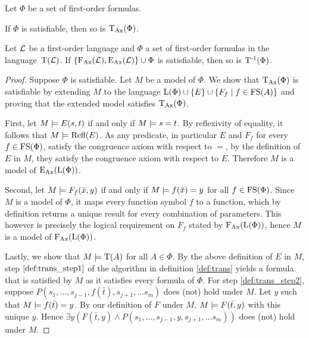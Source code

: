 \begin{prop}
	\label{prop:trans_sat_equiv}
	Let $\Phi$ be a set of first-order formulas.
	\begin{compactenum}
		\item If $\Phi$ is satisfiable, then so is $\operatorname{\operatorname{T}_{Ax}}(\Phi)$.
			\label{prop:trans_sat_equiv1}
		\item Let $\operatorname{\mathcal{L}}$ be a first-order language and $\Phi$ a set of first-order formulas in the language~$\operatorname{T}(\operatorname{\mathcal{L}})$.
			If $\{\operatorname{F_{Ax}}(\operatorname{\mathcal{L}}), \operatorname{E_{Ax}}(\operatorname{\mathcal{L}})\} \cup \Phi $ is satisfiable, then so is $\operatorname{T^{-1}}(\Phi)$.
			\label{prop:trans_sat_equiv2}
	\end{compactenum}
\end{prop}
\begin{proof}
	Suppose $\Phi$ is satisfiable.
	Let $M$ be a model of $\Phi$.
	We show that $\operatorname{\operatorname{T}_{Ax}}(\Phi)$ is satisfiable by extending $M$ to the language $\operatorname{L}(\Phi)\cup\{E\}\cup\{F_f\mid f \in \operatorname{FS}(A)\}$ and proving that the extended model satisfies $\operatorname{\operatorname{T}_{Ax}}(\Phi)$.

	First, let $M \models E(s, t)$ if and only if $M \models s = t$.
	By reflexivity of equality, it follows that $M \models \operatorname{Refl}(E)$.
	As any predicate, in particular $E$ and $F_f$ for every $f \in \operatorname{FS}(\Phi)$, satisfy the congruence axiom with respect to $=$, by the definition of $E$ in $M$, they satisfy the congruence axiom with respect to $E$.
	Therefore $M$ is a model of $\operatorname{E_{Ax}}(\operatorname{L}(\Phi))$.

	Second, let $M \models F_f(\bar x, y)$ if and only if $M \models f(\bar x) = y$ for all $f \in \operatorname{FS}(\Phi)$. 
	Since $M$ is a model of $\Phi$, it maps every function symbol $f$ to a function, which by definition returns a unique result for every combination of parameters.
	This however is precisely the logical requirement on $F_f$ stated by $\operatorname{F_{Ax}}(\operatorname{L}(\Phi))$,   
	hence $M$ is a model of $\operatorname{F_{Ax}}(\operatorname{L}(\Phi))$.

	Lastly, we show that $M \models \operatorname{T}(A)$ for all $A \in \Phi$.
	By the above definition of $E$ in $M$, step $\ref{def:trans_step1}$ of the algorithm in definition \ref{def:trans} yields a formula that is satisfied by $M$ as it satisfies every formula of $\Phi$.
	For step \ref{def:trans_step2}, suppose $P(s_1, \ldots, s_{j-1}, f(\bar t),\allowbreak s_{j+1}, \ldots s_m)$ does (not) hold under $M$.
	Let $y$ such that $M \models f(\bar t)=y$.
	By our definition of $F$ under $M$, $M\models F(\bar t, y)$ with this unique $y$.
	Hence $\exists y (F(\bar t, y) \land P(s_1, \ldots, s_{j-1}, y, \allowbreak s_{j+1}, \ldots s_m))$ does (not) hold under $M$.



\end{proof}
